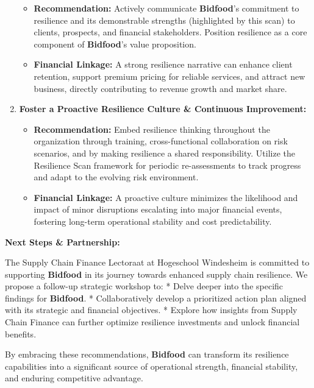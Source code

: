 \documentclass[
  oneside,
  open=any,
  fontsize=11pt]{scrbook}
\providecommand{\tightlist}{%
  \setlength{\itemsep}{0pt}\setlength{\parskip}{0pt}}
\begin{document}
\begin{enumerate}
  \begin{itemize}
  \tightlist
  \item
    \textbf{Recommendation:} Actively communicate \textbf{Bidfood}'s
    commitment to resilience and its demonstrable strengths (highlighted
    by this scan) to clients, prospects, and financial stakeholders.
    Position resilience as a core component of \textbf{Bidfood}'s value
    proposition.
  \item
    \textbf{Financial Linkage:} A strong resilience narrative can
    enhance client retention, support premium pricing for reliable
    services, and attract new business, directly contributing to revenue
    growth and market share.
  \end{itemize}
\item
  \textbf{Foster a Proactive Resilience Culture \& Continuous
  Improvement:}

  \begin{itemize}
  \tightlist
  \item
    \textbf{Recommendation:} Embed resilience thinking throughout the
    organization through training, cross-functional collaboration on
    risk scenarios, and by making resilience a shared responsibility.
    Utilize the Resilience Scan framework for periodic re-assessments to
    track progress and adapt to the evolving risk environment.
  \item
    \textbf{Financial Linkage:} A proactive culture minimizes the
    likelihood and impact of minor disruptions escalating into major
    financial events, fostering long-term operational stability and cost
    predictability.
  \end{itemize}
\end{enumerate}

\textbf{Next Steps \& Partnership:}

The Supply Chain Finance Lectoraat at Hogeschool Windesheim is committed
to supporting \textbf{Bidfood} in its journey towards enhanced supply
chain resilience. We propose a follow-up strategic workshop to: * Delve
deeper into the specific findings for \textbf{Bidfood}. *
Collaboratively develop a prioritized action plan aligned with its
strategic and financial objectives. * Explore how insights from Supply
Chain Finance can further optimize resilience investments and unlock
financial benefits.

By embracing these recommendations, \textbf{Bidfood} can transform its
resilience capabilities into a significant source of operational
strength, financial stability, and enduring competitive advantage.
\end{document}
